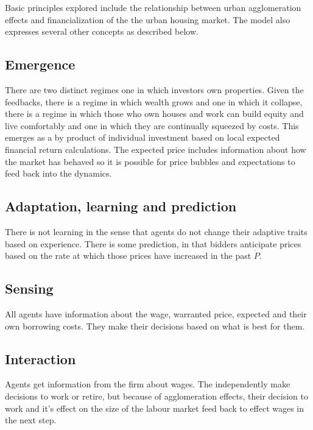 Basic principles explored include the relationship between urban agglomeration effects and financialization of the the urban housing market. The model also expresses several other concepts as described below.

\subsection{Emergence}
There are two distinct regimes one in which investors own properties. Given the feedbacks, there is a regime in which wealth grows and one in which it collapse, there is a regime in which those who own houses and work can build equity and live comfortably and one in which they are continually squeezed by costs. This emerges as a by product of individual investment based on local expected financial return calculations. 
The expected price includes information about how the market has behaved so it is possible for price bubbles and expectations to feed back into the dynamics. 

\subsection{Adaptation, learning and prediction}



There is not learning in the sense that agents do not change their adaptive traits based on experience. 
There is some prediction, in that bidders anticipate prices based on the rate at which those prices have increased in the past $\dot P$.

\subsection{Sensing}
All agents have information about the wage, warranted price, expected and their own borrowing costs. They make their decisions based on what is best for them. 

\subsection{Interaction}
Agents get information from the firm about wages. The independently make decisions to work or retire, but because of agglomeration effects, their decision to work and it's effect on the size of the labour market feed back to effect wages in the next step. 

